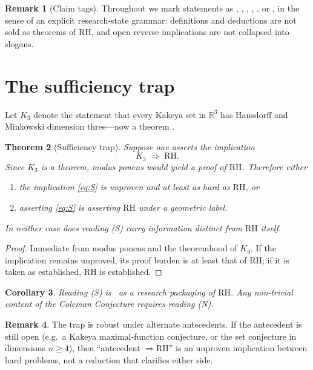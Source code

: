 \documentclass[11pt]{amsart}
\theoremstyle{plain}
\newtheorem{theorem}{Theorem}[section]
\newtheorem{corollary}[theorem]{Corollary}
\theoremstyle{definition}
\newtheorem{remark}[theorem]{Remark}
\newcommand{\RH}{\mathrm{RH}}
\begin{document}
\begin{remark}[Claim tags]
Throughout we mark statements as \PeAIceKnown, \PeAIceFormal, \PeAIceProposed,
\PeAIceOpen, \PeAIceClosedNeg, or \PeAIceAnalogy, in the sense of an explicit
research-state grammar: definitions and deductions are not sold as theorems of
$\RH$, and open reverse implications are not collapsed into slogans.
\end{remark}

\section{The sufficiency trap}
\label{sec:trap}

Let $K_3$ denote the statement that every Kakeya set in $\mathbb{R}^3$ has
Hausdorff and Minkowski dimension three---now a theorem
\cite{WangZahl2025Kakeya}.

\begin{theorem}[Sufficiency trap]
\label{thm:trap}
Suppose one asserts the implication
\begin{equation}
  \label{eq:S}
  K_3 \;\Longrightarrow\; \RH.
\end{equation}
Since $K_3$ is a theorem, modus ponens would yield a proof of $\RH$.
Therefore either
\begin{enumerate}[label=(\roman*)]
  \item the implication \eqref{eq:S} is unproven and at least as hard as $\RH$, or
  \item asserting \eqref{eq:S} is asserting $\RH$ under a geometric label.
\end{enumerate}
In neither case does reading (S) carry information distinct from $\RH$ itself.
\end{theorem}

\begin{proof}
Immediate from modus ponens and the theoremhood of $K_3$.
If the implication remains unproved, its proof burden is at least that of $\RH$;
if it is taken as established, $\RH$ is established.
\end{proof}

\begin{corollary}
\label{cor:S-closed}
Reading (S) is \PeAIceClosedNeg\ as a research packaging of $\RH$.
Any non-trivial content of the Coleman Conjecture requires reading (N).
\end{corollary}

\begin{remark}
The trap is robust under alternate antecedents.
If the antecedent is still open (e.g.\ a Kakeya maximal-function conjecture, or
the set conjecture in dimensions $n\ge 4$), then ``antecedent $\Rightarrow\RH$''
is an unproven implication between hard problems, not a reduction that clarifies
either side.
\end{remark}
\end{document}
